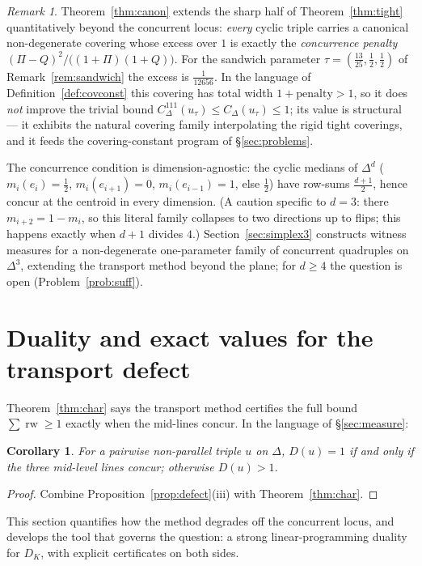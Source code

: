 \documentclass{aims}
\numberwithin{equation}{section}
\theoremstyle{plain}
\newtheorem{corollary}[theorem]{Corollary}
\theoremstyle{definition}
\theoremstyle{remark}
\newtheorem{remark}[theorem]{Remark}
\newcommand{\rw}{\operatorname{rw}}
\begin{document}
\begin{remark}\label{rem:canon}
Theorem~\ref{thm:canon} extends the sharp half of Theorem~\ref{thm:tight}
quantitatively beyond the concurrent locus: \emph{every} cyclic triple
carries a canonical non-degenerate covering whose excess over $1$ is exactly
the \emph{concurrence penalty} $(\Pi-Q)^2/\bigl((1+\Pi)(1+Q)\bigr)$. For the
sandwich parameter $\tau=(\tfrac{13}{25},\tfrac12,\tfrac12)$ of
Remark~\ref{rem:sandwich} the excess is $\tfrac1{12656}$. In the language of
Definition~\ref{def:covconst} this covering has total width $1+\text{penalty}>1$,
so it does \emph{not} improve the trivial bound
$C^{111}_\Delta(u_\tau)\le C_\Delta(u_\tau)\le1$; its value is structural --- it
exhibits the natural covering family interpolating the rigid tight coverings,
and it feeds the covering-constant program of \S\ref{sec:problems}.
\end{remark}

\smallskip
The concurrence condition is dimension-agnostic: the cyclic medians of $\Delta^d$
($m_i(e_i)=\tfrac12$, $m_i(e_{i+1})=0$, $m_i(e_{i-1})=1$, else $\tfrac12$) have
row-sums $\tfrac{d+1}2$, hence concur at the centroid in every dimension. (A
caution specific to $d=3$: there $m_{i+2}=1-m_i$, so this literal family collapses
to two directions up to flips; this happens exactly when $d+1$ divides $4$.)
Section~\ref{sec:simplex3} constructs witness measures for a non-degenerate
one-parameter family of concurrent quadruples on $\Delta^3$, extending the
transport method beyond the plane; for $d\ge4$ the question is open
(Problem~\ref{prob:suff}).

\section{Duality and exact values for the transport defect}\label{sec:defect}
Theorem~\ref{thm:char} says the transport method certifies the full bound
$\sum\rw\ge1$ exactly when the mid-lines concur. In the language of
\S\ref{sec:measure}:

\begin{corollary}\label{cor:done}
For a pairwise non-parallel triple $u$ on $\Delta$, $D(u)=1$ if and only if the
three mid-level lines concur; otherwise $D(u)>1$.
\end{corollary}
\begin{proof}
Combine Proposition~\ref{prop:defect}(iii) with Theorem~\ref{thm:char}.
\end{proof}

This section quantifies how the method degrades off the concurrent locus, and
develops the tool that governs the question: a strong linear-programming
duality for $D_K$, with explicit certificates on both sides.
\end{document}

